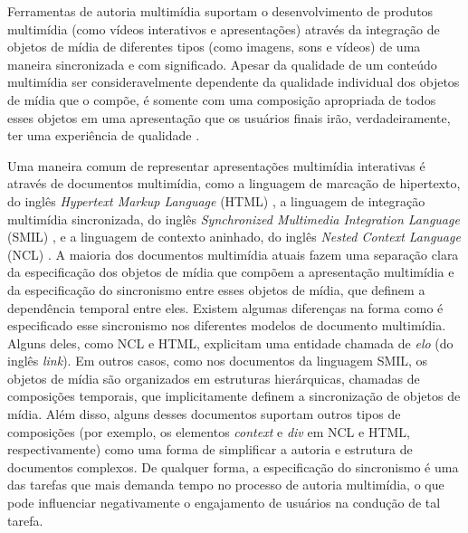 \documentclass[../main.tex]{subfiles}
\begin{document}

Ferramentas de autoria multimídia suportam o desenvolvimento de produtos multimídia (como vídeos interativos e apresentações) através da integração de objetos de mídia de diferentes tipos (como imagens, sons e vídeos) de uma maneira sincronizada e com significado. Apesar da qualidade de um conteúdo multimídia ser consideravelmente dependente da qualidade individual dos objetos de mídia que o compõe, é somente com uma composição apropriada de todos esses objetos em uma apresentação que os usuários finais irão, verdadeiramente, ter uma experiência de qualidade \cite{pellan2009authoring}. 

Uma maneira comum de representar apresentações multimídia interativas é através de documentos multimídia, como a linguagem de marcação de hipertexto, do inglês \emph{Hypertext Markup Language} (HTML) \cite{graham1995html}, a 
linguagem de integração multimídia sincronizada, do inglês \emph{Synchronized Multimedia Integration Language} (SMIL) \cite{rutledge2001smil}, e a 
linguagem de contexto aninhado, do inglês \emph{Nested Context Language} (NCL) \cite{soares2009programando}. A maioria dos documentos multimídia atuais fazem uma separação clara da especificação dos objetos de mídia que compõem a apresentação multimídia e da especificação do sincronismo entre esses objetos de mídia, que definem a dependência temporal entre eles. Existem algumas diferenças na forma como é especificado esse sincronismo nos diferentes modelos de documento multimídia. Alguns deles, como NCL e HTML, explicitam uma entidade chamada de \emph{elo} (do inglês \emph{link}). Em outros casos, como nos documentos da linguagem SMIL, os objetos de mídia são organizados em estruturas hierárquicas, chamadas de composições temporais, que implicitamente definem a sincronização de objetos de mídia. Além disso, alguns desses documentos suportam outros tipos de composições (por exemplo, os elementos \emph{context} e \emph{div} em NCL e HTML, respectivamente) como uma forma de simplificar a autoria e estrutura de documentos complexos. De qualquer forma, a especificação do sincronismo é uma das tarefas que mais demanda tempo no processo de autoria multimídia, o que pode influenciar negativamente o engajamento de usuários na condução de tal tarefa.
\end{document}
